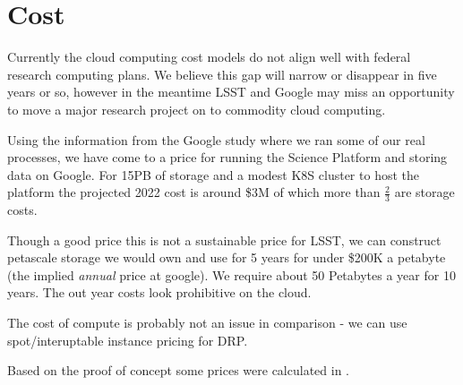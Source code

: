 
\section{Cost}
Currently the cloud computing cost models do  not align well with federal research computing plans. We believe this gap will narrow or disappear in five years or so, however in the meantime LSST and Google may miss an opportunity to move a major research project on to commodity cloud computing.

Using the information from the Google study where we ran some of our real processes, we have come to a price for running the \gls{Science Platform} and storing data on Google. For 15PB of storage and a modest K8S cluster to host the platform the projected 2022 cost is around \$3M of which more than $\frac{2}{3}$ are storage costs.

Though a good price this is not a sustainable price for \gls{LSST}, we can construct petascale storage we would own and use for 5 years for under \$200K a petabyte (the implied \emph{annual} price at google).  We require about 50 Petabytes a year for 10 years. The out year costs look prohibitive on the cloud.

The cost of compute is probably not an issue in comparison - we can use spot/interuptable instance pricing for \gls{DRP}.

Based on the proof of concept some prices were calculated in .


